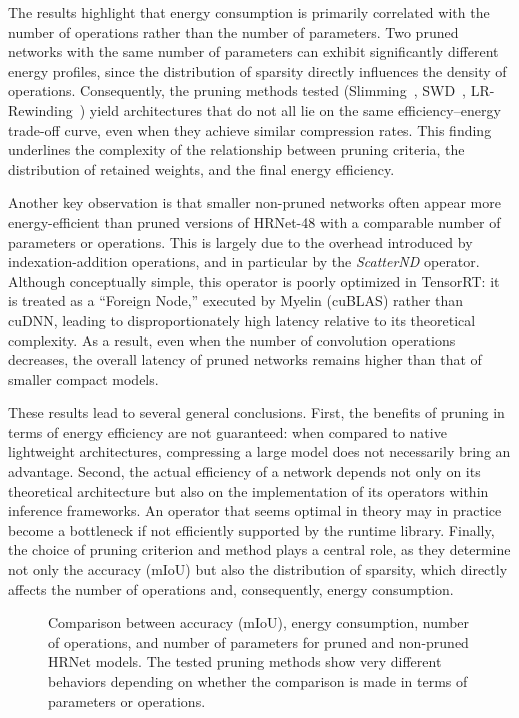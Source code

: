 \documentclass[11pt]{report}
\begin{document}
The results highlight that energy consumption is primarily correlated with the number of operations rather than the number of parameters. Two pruned networks with the same number of parameters can exhibit significantly different energy profiles, since the distribution of sparsity directly influences the density of operations. Consequently, the pruning methods tested (Slimming~\cite{liu2017learning}, SWD~\cite{tessier:hal-03675138}, LR-Rewinding~\cite{renda2020comparing}) yield architectures that do not all lie on the same efficiency–energy trade-off curve, even when they achieve similar compression rates. This finding underlines the complexity of the relationship between pruning criteria, the distribution of retained weights, and the final energy efficiency.

Another key observation is that smaller non-pruned networks often appear more energy-efficient than pruned versions of HRNet-48 with a comparable number of parameters or operations. This is largely due to the overhead introduced by indexation-addition operations, and in particular by the \textit{ScatterND} operator. Although conceptually simple, this operator is poorly optimized in TensorRT: it is treated as a ``Foreign Node,'' executed by Myelin (cuBLAS) rather than cuDNN, leading to disproportionately high latency relative to its theoretical complexity. As a result, even when the number of convolution operations decreases, the overall latency of pruned networks remains higher than that of smaller compact models.

These results lead to several general conclusions. First, the benefits of pruning in terms of energy efficiency are not guaranteed: when compared to native lightweight architectures, compressing a large model does not necessarily bring an advantage. Second, the actual efficiency of a network depends not only on its theoretical architecture but also on the implementation of its operators within inference frameworks. An operator that seems optimal in theory may in practice become a bottleneck if not efficiently supported by the runtime library. Finally, the choice of pruning criterion and method plays a central role, as they determine not only the accuracy (mIoU) but also the distribution of sparsity, which directly affects the number of operations and, consequently, energy consumption.


\begin{figure}[htp]
  \centering
  
  \caption{Comparison between accuracy (mIoU), energy consumption, number of operations, and number of parameters for pruned and non-pruned HRNet models. The tested pruning methods show very different behaviors depending on whether the comparison is made in terms of parameters or operations.}
  \label{fig:sysint_accuracy}
\end{figure}
\end{document}
